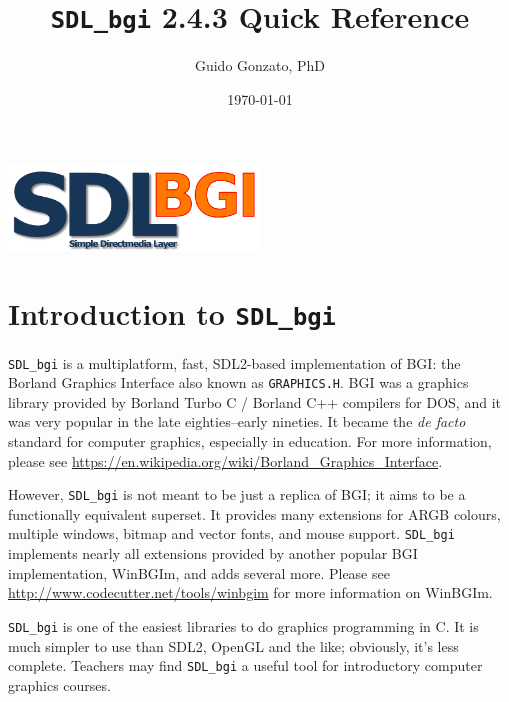 \documentclass[a4paper,12pt]{article}
\newcommand{\SDLbgi}{\texttt{SDL\_bgi}}
\newcommand{\version}{2.4.3}        %
\begin{document}
\title{\SDLbgi{} \version{} Quick Reference}

\author{Guido Gonzato, PhD}

\date{\today}

\maketitle

\begin{center}
  \includegraphics[width=0.5\textwidth]{SDL_bgi_logo.png}
\end{center}

{\small \tableofcontents}


\section{Introduction to \SDLbgi}

\SDLbgi{} is a multiplatform, fast, SDL2-based implementation of BGI:
the Borland Graphics Interface also known as \texttt{GRAPHICS.H}. BGI
was a graphics library provided by Borland Turbo C / Borland C++
compilers for DOS, and it was very popular in the late eighties--early
nineties. It became the \emph{de facto} standard for computer
graphics, especially in education. For more information, please see 
\url{https://en.wikipedia.org/wiki/Borland_Graphics_Interface}.


However, \SDLbgi{} is not meant to be just a replica of BGI; it aims
to be a functionally equivalent superset. It provides many extensions
for ARGB colours, multiple windows, bitmap and vector fonts, and mouse
support. \SDLbgi{} implements nearly all extensions provided by
another popular BGI implementation, WinBGIm, and adds several more.
Please see \url{http://www.codecutter.net/tools/winbgim} for more
information on WinBGIm.

\SDLbgi{} is one of the easiest libraries to do graphics programming
in C. It is much simpler to use than SDL2, OpenGL and the like;
obviously, it's less complete. Teachers may find \SDLbgi{} a useful
tool for introductory computer graphics courses.
\end{document}
